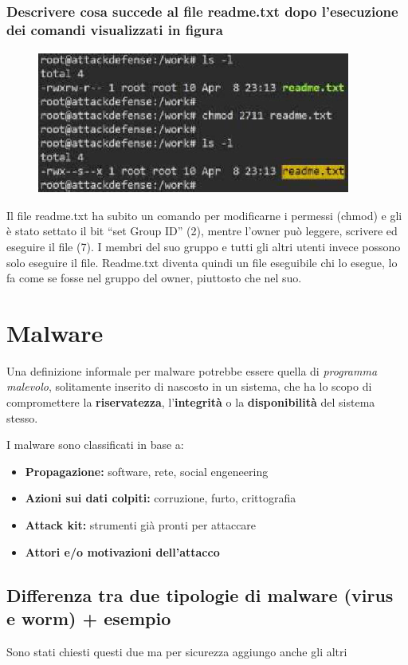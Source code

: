 \documentclass{report}
\begin{document}
\subsection{Descrivere cosa succede al file readme.txt dopo l’esecuzione dei comandi visualizzati in figura}
\begin{figure}[H]
    \centering
    \includegraphics[width=0.8\linewidth]{images/readme.png}
\end{figure}
Il file readme.txt ha subito un comando per modificarne i permessi (chmod) e gli è stato settato il bit “set Group ID” (2), mentre l’owner può leggere, scrivere ed eseguire il file (7). I membri del suo gruppo e tutti gli altri utenti invece possono solo eseguire il file.
Readme.txt diventa quindi un file eseguibile chi lo esegue, lo fa come se fosse nel gruppo del owner, piuttosto che nel suo.



\chapter{Malware}
\noindent Una definizione informale per malware potrebbe essere quella di \textit{programma malevolo},
solitamente inserito di nascosto in un sistema, che ha lo scopo di compromettere la \textbf{riservatezza}, l'\textbf{integrità} o la \textbf{disponibilità} 
del sistema stesso.

\noindent I malware sono classificati in base a:
\begin{itemize}
    \item \textbf{Propagazione:} software, rete, social engeneering
    \item \textbf{Azioni sui dati colpiti:} corruzione, furto, crittografia
    \item \textbf{Attack kit:} strumenti già pronti per attaccare
    \item \textbf{Attori e/o motivazioni dell'attacco}
\end{itemize}

\section{Differenza tra due tipologie di malware (virus e worm) + esempio}
\noindent Sono stati chiesti questi due ma per sicurezza aggiungo anche gli altri
\end{document}

